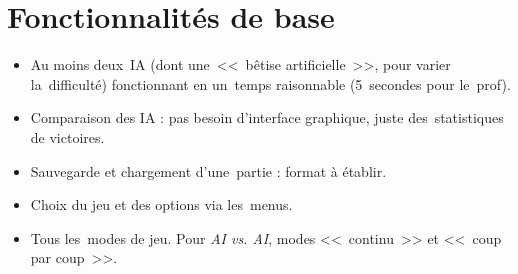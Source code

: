 \section{Fonctionnalités de base}
\begin{itemize}
    \item Au moins deux~IA (dont une~<<~bêtise artificielle~>>, pour varier la~difficulté) fonctionnant en un~temps raisonnable (5~secondes pour le~prof).
	\item Comparaison des IA : pas besoin d'interface graphique, juste des~statistiques de victoires.
	\item Sauvegarde et chargement d'une~partie : format à établir.
    \item Choix du jeu et des options via les~menus.
    \item Tous les~modes de jeu. Pour \textit{AI vs. AI}, modes <<~continu~>> et <<~coup par coup~>>.
\end{itemize}
